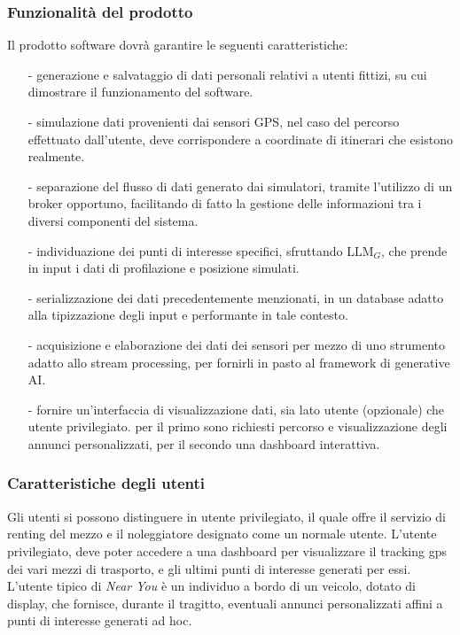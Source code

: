 \documentclass[11pt]{article}
\begin{document}
\begin{justify}
\subsubsection{Funzionalità del prodotto}
Il prodotto software dovrà garantire le seguenti caratteristiche:
\begin{itemize}
    \item [-] generazione e salvataggio di dati personali relativi a utenti fittizi, su cui dimostrare il funzionamento del software.
    \item [-] simulazione dati provenienti dai sensori GPS, nel caso del percorso effettuato dall'utente, deve corrispondere a coordinate di itinerari che esistono realmente.
    \item [-] separazione del flusso di dati generato dai simulatori, tramite l'utilizzo di un broker opportuno, facilitando di fatto la gestione delle informazioni tra i diversi componenti del sistema.
    \item [-] individuazione dei punti di interesse specifici, sfruttando LLM$_G$, che prende in input i dati di profilazione e posizione simulati.
    \item [-] serializzazione dei dati precedentemente menzionati, in un database adatto alla tipizzazione degli input e performante in tale contesto.
    \item [-] acquisizione e elaborazione dei dati dei sensori per mezzo di uno strumento adatto allo stream processing, per fornirli in pasto al framework di generative AI.
    \item [-] fornire un'interfaccia di visualizzazione dati, sia lato utente (opzionale) che utente privilegiato. per il primo sono richiesti percorso e visualizzazione degli annunci personalizzati, per il secondo una dashboard interattiva.
\end{itemize}

\subsubsection{Caratteristiche degli utenti}
Gli utenti si possono distinguere in utente privilegiato, il quale offre il servizio di renting del mezzo e il noleggiatore designato come un normale utente. L'utente privilegiato, deve poter accedere a una dashboard per visualizzare il tracking gps dei vari mezzi di trasporto, e gli ultimi punti di interesse generati per essi. L'utente tipico di \textit{Near You} è un individuo a bordo di un veicolo, dotato di display, che fornisce, durante il tragitto, eventuali annunci personalizzati affini a punti di interesse generati ad hoc.


\end{justify}
\end{document}
